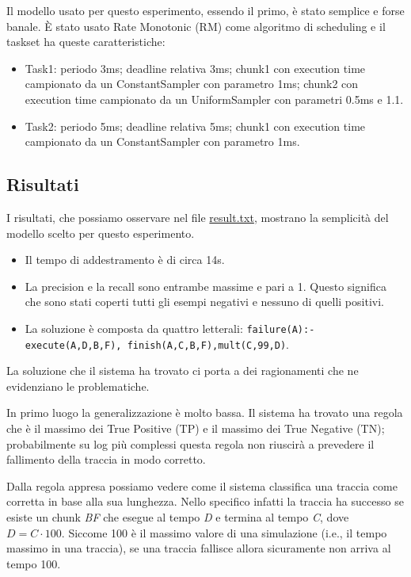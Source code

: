 \myskip

Il modello usato per questo esperimento, essendo il primo, è stato semplice e forse banale. È stato usato Rate Monotonic (RM) come algoritmo di scheduling e il taskset ha queste caratteristiche:
\begin{itemize}
    \item Task1: periodo 3ms; deadline relativa 3ms; chunk1 con execution time campionato da un ConstantSampler con parametro 1ms; chunk2 con execution time campionato da un UniformSampler con parametri 0.5ms e 1.1.
    \item Task2: periodo 5ms; deadline relativa 5ms; chunk1 con execution time campionato da un ConstantSampler con parametro 1ms.
\end{itemize}

\subsection{Risultati}
I risultati, che possiamo osservare nel file \href{https://github.com/edoardosarri24/numsynth/tree/main/my-experiments/1-start/result.txt}{result.txt}, mostrano la semplicità del modello scelto per questo esperimento.
\begin{itemize}
    \item Il tempo di addestramento è di circa 14s.
    \item La precision e la recall sono entrambe massime e pari a 1. Questo significa che sono stati coperti tutti gli esempi negativi e nessuno di quelli positivi.
    \item La soluzione è composta da quattro letterali: \texttt{failure(A):-execute(A,D,B,F), \allowbreak finish(A,C,B,F),mult(C,99,D)}.
\end{itemize}

\myskip

La soluzione che il sistema ha trovato ci porta a dei ragionamenti che ne evidenziano le problematiche.

In primo luogo la generalizzazione è molto bassa. Il sistema ha trovato una regola che è il massimo dei True Positive (TP) e il massimo dei True Negative (TN); probabilmente su log più complessi questa regola non riuscirà a prevedere il fallimento della traccia in modo corretto.

Dalla regola appresa possiamo vedere come il sistema classifica una traccia come corretta in base alla sua lunghezza. Nello specifico infatti la traccia ha successo se esiste un chunk \textit{BF} che esegue al tempo \textit{D} e termina al tempo \textit{C}, dove $D=C\cdot100$. Siccome 100 è il massimo valore di una simulazione (i.e., il tempo massimo in una traccia), se una traccia fallisce allora sicuramente non arriva al tempo 100.

